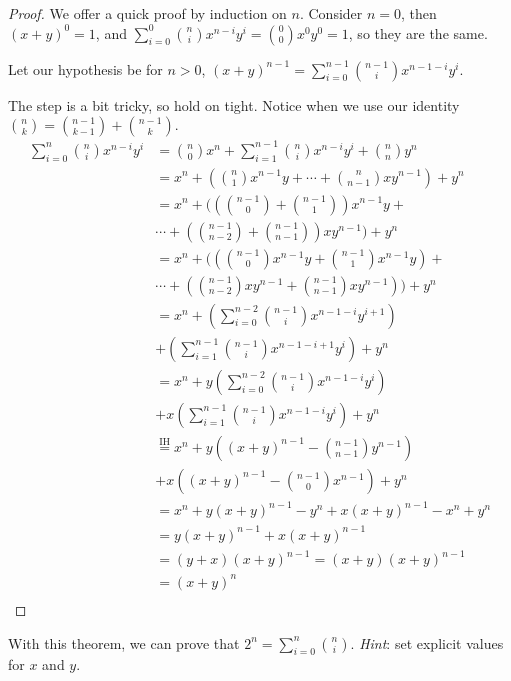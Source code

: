 \documentclass[main.tex]{subfiles}
\begin{document}
\begin{proof}
	We offer a quick proof by induction on \(n\). Consider \(n=0\), then \((x+y)^0 = 1\), and \(\sum_{i=0}^{0} \binom{n}{i} x^{n-i}y^i = \binom{0}{0} x^0y^0 = 1\), so they are the same.
	
	Let our hypothesis be for \(n>0\), \((x+y)^{n-1} = \sum_{i=0}^{n-1} \binom{n-1}{i} x^{n-1-i}y^i\).
	
	The step is a bit tricky, so hold on tight. Notice when we use our identity \(\binom{n}{k} = \binom{n-1}{k-1} + \binom{n-1}{k}\).
	\begin{align*}
	\sum_{i=0}^{n} \binom{n}{i} x^{n-i}y^i &= \binom{n}{0} x^n + \sum_{i=1}^{n-1} \binom{n}{i} x^{n-i}y^i + \binom{n}{n} y^n \\
	&= x^n + ( \binom{n}{1}x^{n-1}y + \cdots + \binom{n}{n-1}xy^{n-1} ) + y^n \\
	&= x^n + ( (\binom{n-1}{0} + \binom{n-1}{1})x^{n-1}y + \\
	& \cdots + (\binom{n-1}{n-2} + \binom{n-1}{n-1})xy^{n-1} ) + y^n \\
	&= x^n + ( (\binom{n-1}{0}x^{n-1}y + \binom{n-1}{1}x^{n-1}y) + \\
	& \cdots + (\binom{n-1}{n-2}xy^{n-1} + \binom{n-1}{n-1}xy^{n-1}) ) + y^n \\
	&= x^n + (\sum_{i=0}^{n-2} \binom{n-1}{i} x^{n-1-i}y^{i+1}) \\
	& + (\sum_{i=1}^{n-1} \binom{n-1}{i} x^{n-1-i+1}y^{i}) + y^n \\
	&= x^n + y(\sum_{i=0}^{n-2} \binom{n-1}{i} x^{n-1-i}y^{i}) \\
	& + x(\sum_{i=1}^{n-1} \binom{n-1}{i} x^{n-1-i}y^{i}) + y^n \\
	&\stackrel{\text{IH}}{=} x^n + y((x+y)^{n-1} - \binom{n-1}{n-1}y^{n-1}) \\
	& + x((x+y)^{n-1} - \binom{n-1}{0}x^{n-1}) + y^n \\
	&= x^n + y(x+y)^{n-1} - y^{n} + x(x+y)^{n-1} - x^{n} + y^n \\
	&= y(x+y)^{n-1} + x(x+y)^{n-1} \\
	&= (y+x)(x+y)^{n-1} = (x+y)(x+y)^{n-1} \\
	&= (x+y)^n \\
	\end{align*}
\end{proof}

\begin{rem}
	With this theorem, we can prove that \(2^n = \sum_{i=0}^{n} \binom{n}{i}\). \textit{Hint}: set explicit values for \(x\) and \(y\).
\end{rem}
\end{document}
